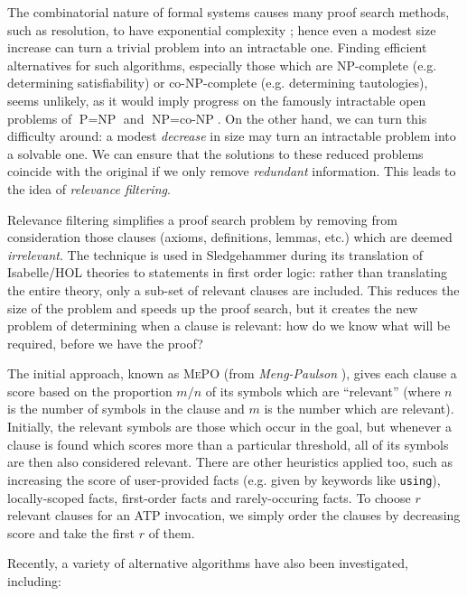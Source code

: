 \documentclass[]{article}
\begin{document}
The combinatorial nature of formal systems causes many proof search methods, such as resolution, to have exponential complexity \cite{haken1985intractability}; hence even a modest size increase can turn a trivial problem into an intractable one. Finding efficient alternatives for such algorithms, especially those which are NP-complete (e.g. determining satisfiability) or co-NP-complete (e.g. determining tautologies), seems unlikely, as it would imply progress on the famously intractable open problems of $\text{P} = \text{NP}$ and $\text{NP} = \text{co-NP}$. On the other hand, we can turn this difficulty around: a modest \emph{decrease} in size may turn an intractable problem into a solvable one. We can ensure that the solutions to these reduced problems coincide with the original if we only remove \emph{redundant} information. This leads to the idea of \emph{relevance filtering}.

Relevance filtering simplifies a proof search problem by removing from consideration those clauses (axioms, definitions, lemmas, etc.) which are deemed \emph{irrelevant}. The technique is used in Sledgehammer during its translation of Isabelle/HOL theories to statements in first order logic: rather than translating the entire theory, only a sub-set of relevant clauses are included. This reduces the size of the problem and speeds up the proof search, but it creates the new problem of determining when a clause is relevant: how do we know what will be required, before we have the proof?

The initial approach, known as \textsc{MePO} (from \emph{Meng-Paulson} \cite{meng2009lightweight}), gives each clause a score based on the proportion $m / n$ of its symbols which are ``relevant'' (where $n$ is the number of symbols in the clause and $m$ is the number which are relevant). Initially, the relevant symbols are those which occur in the goal, but whenever a clause is found which scores more than a particular threshold, all of its symbols are then also considered relevant. There are other heuristics applied too, such as increasing the score of user-provided facts (e.g. given by keywords like \texttt{using}), locally-scoped facts, first-order facts and rarely-occuring facts. To choose $r$ relevant clauses for an ATP invocation, we simply order the clauses by decreasing score and take the first $r$ of them.

Recently, a variety of alternative algorithms have also been investigated, including:
\end{document}
